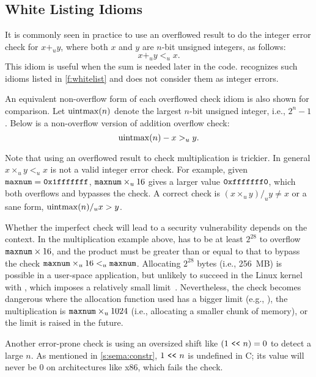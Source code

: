 \subsection{White Listing Idioms}
\label{s:sema:whitelist}

It is commonly seen in practice to use an overflowed result to do
the integer error check for $x +_u y$, where both $x$ and $y$ are
$n$-bit unsigned integers, as follows:
\begin{equation*}
x +_u y <_u x.
\end{equation*}
This idiom is useful when the sum is needed later in the code.
\sys recognizes such idioms listed in \autoref{f:whitelist} and
does not consider them as integer errors.

An equivalent non-overflow form of each overflowed check idiom is
also shown for comparison.  Let $\operatorname{uintmax}(n)$ denote the largest
$n$-bit unsigned integer, i.e., $2^n - 1$.  Below is a non-overflow
version of addition overflow check:
\begin{equation*}
\operatorname{uintmax}(n) - x >_u y.
\end{equation*}

Note that using an overflowed result to check multiplication is
trickier.  In general $x \times_u y <_u x$ is not a valid integer
error check.  For example, given $\texttt{maxnum} = \texttt{0x1fffffff}$,
$\texttt{maxnum} \times_u 16$ gives a larger value $\texttt{0xfffffff0}$,
which both overflows and bypasses the check.  A correct check is
$(x \times_u y) /_u y \neq x$ or a sane form, $\operatorname{uintmax}(n) /_u x >
y$.

Whether the imperfect check will lead to a security vulnerability
depends on the context.  In the multiplication example above,
 has to be at least $2^{28}$ to overflow $\texttt{maxnum}
\times 16$, and the product must be greater than or equal to that
to bypass the check $\texttt{maxnum} \times_u 16 <_u \texttt{maxnum}$.
Allocating $2^{28}$ bytes (i.e., 256~MB) is possible in a user-space
application, but unlikely to succeed in the Linux kernel with
, which imposes a relatively small
limit~\cite[\chapterautorefname~8]{ldd3}.  Nevertheless, the check
becomes dangerous where the allocation function used has a bigger
limit (e.g., ), the multiplication is $\texttt{maxnum}
\times_u 1024$ (i.e., allocating a smaller chunk of memory), or the
 limit is raised in the future.

Another error-prone check is using an oversized shift like $(1 \ \texttt{<}\texttt{<}\ 
n) = 0$ to detect a large $n$.  As mentioned in \autoref{s:sema:constr},
${1 \ \texttt{<}\texttt{<}\  n}$ is undefined in C; its value will never be 0 on
architectures like x86, which fails the check.

